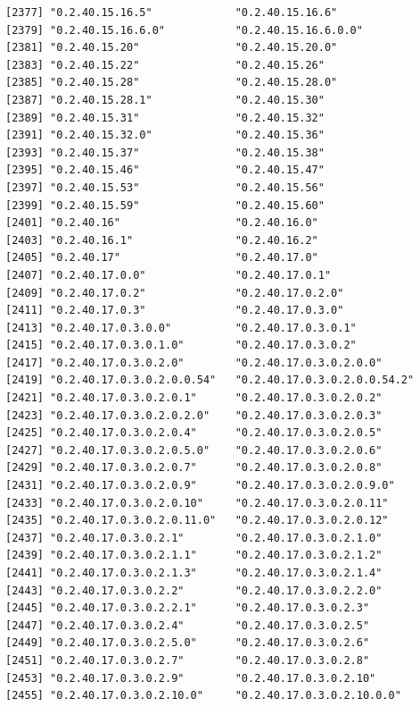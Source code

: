 \documentclass[
  letterpaper,
  DIV=11,
  numbers=noendperiod]{scrreprt}
\begin{document}
\begin{verbatim}
[2377] "0.2.40.15.16.5"             "0.2.40.15.16.6"            
[2379] "0.2.40.15.16.6.0"           "0.2.40.15.16.6.0.0"        
[2381] "0.2.40.15.20"               "0.2.40.15.20.0"            
[2383] "0.2.40.15.22"               "0.2.40.15.26"              
[2385] "0.2.40.15.28"               "0.2.40.15.28.0"            
[2387] "0.2.40.15.28.1"             "0.2.40.15.30"              
[2389] "0.2.40.15.31"               "0.2.40.15.32"              
[2391] "0.2.40.15.32.0"             "0.2.40.15.36"              
[2393] "0.2.40.15.37"               "0.2.40.15.38"              
[2395] "0.2.40.15.46"               "0.2.40.15.47"              
[2397] "0.2.40.15.53"               "0.2.40.15.56"              
[2399] "0.2.40.15.59"               "0.2.40.15.60"              
[2401] "0.2.40.16"                  "0.2.40.16.0"               
[2403] "0.2.40.16.1"                "0.2.40.16.2"               
[2405] "0.2.40.17"                  "0.2.40.17.0"               
[2407] "0.2.40.17.0.0"              "0.2.40.17.0.1"             
[2409] "0.2.40.17.0.2"              "0.2.40.17.0.2.0"           
[2411] "0.2.40.17.0.3"              "0.2.40.17.0.3.0"           
[2413] "0.2.40.17.0.3.0.0"          "0.2.40.17.0.3.0.1"         
[2415] "0.2.40.17.0.3.0.1.0"        "0.2.40.17.0.3.0.2"         
[2417] "0.2.40.17.0.3.0.2.0"        "0.2.40.17.0.3.0.2.0.0"     
[2419] "0.2.40.17.0.3.0.2.0.0.54"   "0.2.40.17.0.3.0.2.0.0.54.2"
[2421] "0.2.40.17.0.3.0.2.0.1"      "0.2.40.17.0.3.0.2.0.2"     
[2423] "0.2.40.17.0.3.0.2.0.2.0"    "0.2.40.17.0.3.0.2.0.3"     
[2425] "0.2.40.17.0.3.0.2.0.4"      "0.2.40.17.0.3.0.2.0.5"     
[2427] "0.2.40.17.0.3.0.2.0.5.0"    "0.2.40.17.0.3.0.2.0.6"     
[2429] "0.2.40.17.0.3.0.2.0.7"      "0.2.40.17.0.3.0.2.0.8"     
[2431] "0.2.40.17.0.3.0.2.0.9"      "0.2.40.17.0.3.0.2.0.9.0"   
[2433] "0.2.40.17.0.3.0.2.0.10"     "0.2.40.17.0.3.0.2.0.11"    
[2435] "0.2.40.17.0.3.0.2.0.11.0"   "0.2.40.17.0.3.0.2.0.12"    
[2437] "0.2.40.17.0.3.0.2.1"        "0.2.40.17.0.3.0.2.1.0"     
[2439] "0.2.40.17.0.3.0.2.1.1"      "0.2.40.17.0.3.0.2.1.2"     
[2441] "0.2.40.17.0.3.0.2.1.3"      "0.2.40.17.0.3.0.2.1.4"     
[2443] "0.2.40.17.0.3.0.2.2"        "0.2.40.17.0.3.0.2.2.0"     
[2445] "0.2.40.17.0.3.0.2.2.1"      "0.2.40.17.0.3.0.2.3"       
[2447] "0.2.40.17.0.3.0.2.4"        "0.2.40.17.0.3.0.2.5"       
[2449] "0.2.40.17.0.3.0.2.5.0"      "0.2.40.17.0.3.0.2.6"       
[2451] "0.2.40.17.0.3.0.2.7"        "0.2.40.17.0.3.0.2.8"       
[2453] "0.2.40.17.0.3.0.2.9"        "0.2.40.17.0.3.0.2.10"      
[2455] "0.2.40.17.0.3.0.2.10.0"     "0.2.40.17.0.3.0.2.10.0.0"  

\end{verbatim}
\end{document}
